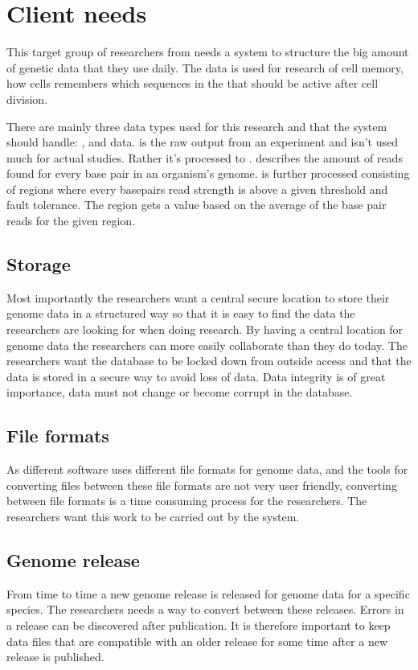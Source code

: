 \section{Client needs}
This target group of researchers from  needs a system to structure the big amount of genetic data that they use daily. The data is used for research of cell memory, how cells remembers which sequences in the  that should be active after cell division. 

There are mainly three data types used for this research and that the system should handle: ,  and  data.  is the raw output from an experiment and isn't used much for actual studies. Rather it's processed to .  describes the amount of reads found for every base pair in an organism's genome.  is further processed  consisting of regions where every basepairs read strength is above a given threshold and fault tolerance. The region gets a value based on the average of the base pair reads for the given region.

\subsection{Storage}
Most importantly the researchers want a central secure location to store their genome data in a structured  way so that it is easy to find the data the researchers are looking for when doing research. By having a central location for genome data the researchers can more easily collaborate than they do today. The researchers want the database to be locked down from outside access and that the data is stored in a secure way to avoid loss of data. Data integrity is of great importance, data must not change or become corrupt in the database.

\subsection{File formats}
As different software uses different file formats for genome data, and the tools for converting files between these file formats are not very user friendly, converting between file formats is a time consuming process for the researchers.  The researchers want this work to be carried out by the system.

\subsection{Genome release}
From time to time a new genome release is released for genome data for a specific species. The researchers needs a way to convert between these releases. Errors in a release can be discovered after publication. It is therefore important to keep data files that are compatible with an older release for some time after a new release is published.  

